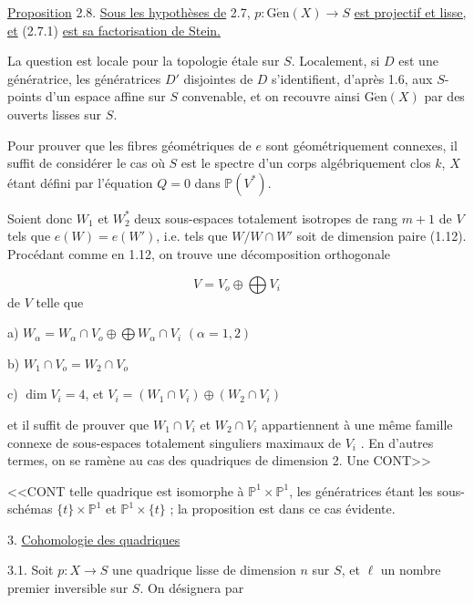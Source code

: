 
\underline{Proposition} 2.8. \underline{Sous les hypothèses de} 2.7, $p : \mathrm{G\acute{e}n}(X) \longrightarrow S$ \underline{est projectif et lisse, et} (2.7.1) \underline{est sa factorisation de Stein.}

La question est locale pour la topologie étale sur $S$. Localement, si $D$ est une génératrice, les génératrices $D'$ disjointes de $D$ s'identifient, d'après 1.6, aux $S$-points d'un espace affine sur $S$ convenable, et on recouvre ainsi $\mathrm{G\acute{e}n}(X)$ par des ouverts lisses sur $S$.

Pour prouver que les fibres géométriques de $e$ sont géométriquement connexes, il suffit de considérer le cas où $S$ est le spectre d'un corps algébriquement clos $k$, $X$ étant défini par l'équation $Q = 0$ dans $\mathbb{P}(V^*)$.

Soient donc $W_1$ et $W^*_2$ deux sous-espaces totalement isotropes de rang $m + 1$ de $V$ tels que $e(W) = e(W')$, i.e. tels que $W/W \cap W'$ soit de dimension paire (1.12). Procédant comme en 1.12, on trouve une décomposition orthogonale

\begin{equation*}
V = V_o \oplus \bigoplus V_i
\end{equation*}
de $V$ telle que

a) \quad $W_\alpha = W_\alpha \cap V_o \oplus \bigoplus W_\alpha \cap V_i$ \qquad $(\alpha = 1,2)$

b) \quad $W_1 \cap V_o = W_2 \cap V_o$

c) \quad $\dim V_i = 4$, et $V_i = (W_1 \cap V_i) \oplus (W_2 \cap V_i)$

et il suffit de prouver que $W_1 \cap V_i$ et $W_2 \cap V_i$ appartiennent à une même famille connexe de sous-espaces totalement singuliers maximaux de $V_i$ . En d'autres termes, on se ramène au cas des quadriques de dimension 2. Une CONT>>



<<CONT telle quadrique est isomorphe à $\mathbb{P}^1 \times \mathbb{P}^1$, les génératrices étant les sous-schémas $\{t\} \times \mathbb{P}^1$ et $\mathbb{P}^1 \times \{t\}$ ; la proposition est dans ce cas évidente.


3. \underline{Cohomologie des quadriques}

3.1. Soit $p : X \longrightarrow S$ une quadrique lisse de dimension $n$ sur $S$, et $\ell$ un nombre premier inversible sur $S$. On désignera par

